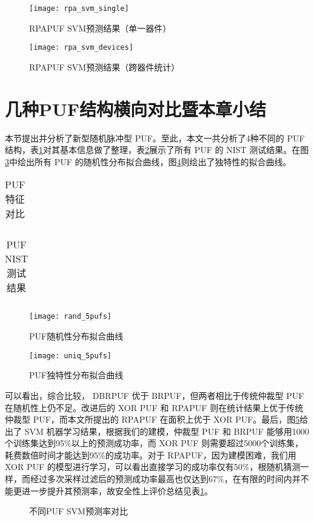 \begin{figure}[htb!]
\centering
\texttt{[image: rpa\_svm\_single]}
\caption{RPAPUF SVM预测结果（单一器件）}
\label{fig:rpa-svm}
\end{figure}

\begin{figure}[htb!]
\centering
\texttt{[image: rpa\_svm\_devices]}
\caption{RPAPUF SVM预测结果（跨器件统计）}
\label{fig:rpa-svm-devices}
\end{figure}

\section{几种PUF结构横向对比暨本章小结}\label{sec:rpa_summary}
本节提出并分析了新型随机脉冲型 PUF。至此，本文一共分析了4种不同的 PUF 结构，表\ref{tab:puf_cmp}对其基本信息做了整理，表\ref{tab:puf_nist}展示了所有 PUF 的 NIST 测试结果。在图\ref{fig:pufs_rand}中绘出所有 PUF 的随机性分布拟合曲线，图\ref{fig:pufs_uniq}则绘出了独特性的拟合曲线。

\begin{table}[htb]
\centering
\caption{PUF特征对比}\label{tab:puf_cmp}
\begin{tabular}{c}

\end{tabular}
\end{table}

\begin{table}[htb]
\centering
\caption{PUF NIST测试结果}\label{tab:puf_nist}
\begin{tabular}{c}

\end{tabular}
\end{table}

\begin{figure}[htb]
\centering
\texttt{[image: rand\_5pufs]}
\caption{PUF随机性分布拟合曲线}
\label{fig:pufs_rand}
\end{figure}

\begin{figure}[htb]
\centering
\texttt{[image: uniq\_5pufs]}
\caption{PUF独特性分布拟合曲线}
\label{fig:pufs_uniq}
\end{figure}

可以看出，综合比较， DBRPUF 优于 BRPUF，但两者相比于传统仲裁型 PUF 在随机性上仍不足。改进后的 XOR PUF 和 RPAPUF 则在统计结果上优于传统仲裁型 PUF，而本文所提出的 RPAPUF 在面积上优于 XOR PUF。最后，图\ref{fig:svm_all}给出了 SVM 机器学习结果，根据我们的建模，仲裁型 PUF 和 BRPUF 能够用1000个训练集达到95\%以上的预测成功率，而 XOR PUF 则需要超过5000个训练集，耗费数倍时间才能达到95\%的成功率。对于 RPAPUF，因为建模困难，我们用 XOR PUF 的模型进行学习，可以看出直接学习的成功率仅有50\%，根随机猜测一样，而经过多次采样过滤后的预测成功率最高也仅达到67\%，在有限的时间内并不能更进一步提升其预测率，故安全性上评价总结见表\ref{tab:puf_cmp}。

\begin{figure}[htb!]
\centering
\caption{不同PUF SVM预测率对比}
\label{fig:svm_all}
\end{figure}
